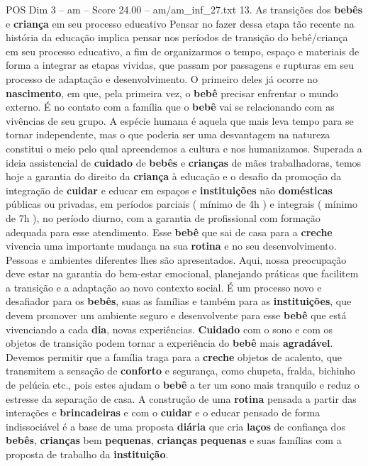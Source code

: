 \begin{textsample}{POS Dim 3 – am – Score 24.00 – am/am\_inf\_27.txt}  \label{ex:f3_pos_040}
13.
As transições dos \textbf{bebês} e \textbf{criança} em seu processo educativo Pensar no fazer dessa etapa tão recente na história da educação implica pensar nos períodos de transição do bebê/criança em seu processo educativo, a fim de organizarmos o tempo, espaço e materiais de forma a integrar as etapas vividas, que passam por passagens e rupturas em seu processo de adaptação e desenvolvimento.
O primeiro deles já ocorre no \textbf{nascimento}, em que, pela primeira vez, o \textbf{bebê} precisar enfrentar o mundo externo.
É no contato com a família que o \textbf{bebê} vai se relacionando com as vivências de seu grupo.
A espécie humana é aquela que mais leva tempo para se tornar independente, mas o que poderia ser uma desvantagem na natureza constitui o meio pelo qual apreendemos a cultura e nos humanizamos.
Superada a ideia assistencial de \textbf{cuidado} de \textbf{bebês} e \textbf{crianças} de mães trabalhadoras, temos hoje a garantia do direito da \textbf{criança} à educação e o desafio da promoção da integração de \textbf{cuidar} e educar em espaços e \textbf{instituições} não \textbf{domésticas} públicas ou privadas, em períodos parciais ( mínimo de 4h ) e integrais ( mínimo de 7h ), no período diurno, com a garantia de profissional com formação adequada para esse atendimento.
Esse \textbf{bebê} que sai de casa para a \textbf{creche} vivencia uma importante mudança na sua \textbf{rotina} e no seu desenvolvimento.
Pessoas e ambientes diferentes lhes são apresentados.
Aqui, nossa preocupação deve estar na garantia do bem-estar emocional, planejando práticas que facilitem a transição e a adaptação ao novo contexto social.
É um processo novo e desafiador para os \textbf{bebês}, suas as famílias e também para as \textbf{instituições}, que devem promover um ambiente seguro e desenvolvente para esse \textbf{bebê} que está vivenciando a cada \textbf{dia}, novas experiências. \textbf{Cuidado} com o sono e com os objetos de transição podem tornar a experiência do \textbf{bebê} mais \textbf{agradável}.
Devemos permitir que a família traga para a \textbf{creche} objetos de acalento, que transmitem a sensação de \textbf{conforto} e segurança, como chupeta, fralda, bichinho de pelúcia etc., pois estes ajudam o \textbf{bebê} a ter um sono mais tranquilo e reduz o estresse da separação de casa.
A construção de uma \textbf{rotina} pensada a partir das interações e \textbf{brincadeiras} e com o \textbf{cuidar} e o educar pensado de forma indissociável é a base de uma proposta \textbf{diária} que cria \textbf{laços} de confiança dos \textbf{bebês}, \textbf{crianças} bem \textbf{pequenas}, \textbf{crianças} \textbf{pequenas} e suas famílias com a proposta de trabalho da \textbf{instituição}.

\end{textsample}
